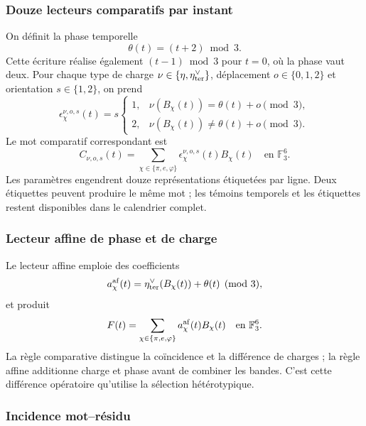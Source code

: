 \subsubsection{Douze lecteurs comparatifs par instant}

On définit la phase temporelle
\[
 \theta(t)=(t+2)\bmod3.
\]
Cette écriture réalise également $(t-1)\bmod3$ pour $t=0$, où la phase
vaut deux. Pour chaque type de charge
$\nu\in\{\eta,\eta_{\rm ter}^\vee\}$, déplacement
$o\in\{0,1,2\}$ et orientation $s\in\{1,2\}$, on prend
\[
 \epsilon_\chi^{\nu,o,s}(t)=s
 \begin{cases}
 1,&\nu(B_\chi(t))=\theta(t)+o\pmod3,\\
 2,&\nu(B_\chi(t))\ne\theta(t)+o\pmod3.
 \end{cases}
\]
Le mot comparatif correspondant est
\begin{equation}
 C_{\nu,o,s}(t)=
 \sum_{\chi\in\{\pi,e,\varphi\}}
 \epsilon_\chi^{\nu,o,s}(t)B_\chi(t)
 \quad\text{en }\mathbb F_3^6.
 \label{act21:eq:kdes-comparativo}
\end{equation}
Les paramètres engendrent douze représentations étiquetées par ligne. Deux
étiquettes peuvent produire le même mot ; les témoins temporels et
les étiquettes restent disponibles dans le calendrier complet.

\subsubsection{Lecteur affine de phase et de charge}

Le lecteur affine emploie des coefficients
\[
 a_\chi^{\rm af}(t)=\eta_{\rm ter}^\vee(B_\chi(t))+\theta(t)
 \pmod3,
\]
et produit
\begin{equation}
 F(t)=\sum_{\chi\in\{\pi,e,\varphi\}}
 a_\chi^{\rm af}(t)B_\chi(t)
 \quad\text{en }\mathbb F_3^6.
 \label{act21:eq:kdes-afin}
\end{equation}
La règle comparative distingue la coïncidence et la différence de charges ; la règle affine additionne charge et phase avant de combiner les bandes. C'est cette différence opératoire qu'utilise la sélection hétérotypique.

\subsubsection{Incidence mot--résidu}

